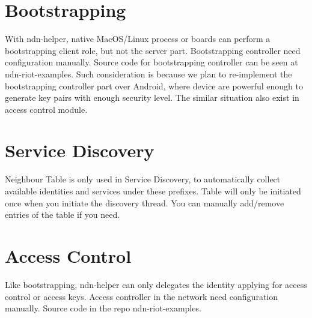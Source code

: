 \documentclass[a4paper, 11pt]{article}
\begin{document}
    \section{Bootstrapping}
    With ndn-helper, native MacOS/Linux process or boards can perform a bootstrapping client role, but not the server part. Bootstrapping controller need configuration manually. Source code for bootstrapping controller can be seen at ndn-riot-examples. Such consideration is because we plan to re-implement the bootstrapping controller part over Android, where device are powerful enough to generate key pairs with enough security level. The similar situation also exist in access control module.
    
    \section{Service Discovery}
    Neighbour Table is only used in Service Discovery, to automatically collect available identities and services under these prefixes. Table will only be initiated once when you initiate the discovery thread. You can manually add/remove entries of the table if you need.
    
    \section{Access Control}
    Like bootstrapping, ndn-helper can only delegates the identity applying for access control or access keys. Access controller in the network need configuration manually. Source code in the repo ndn-riot-examples.

    
    
    
    
\end{document}
